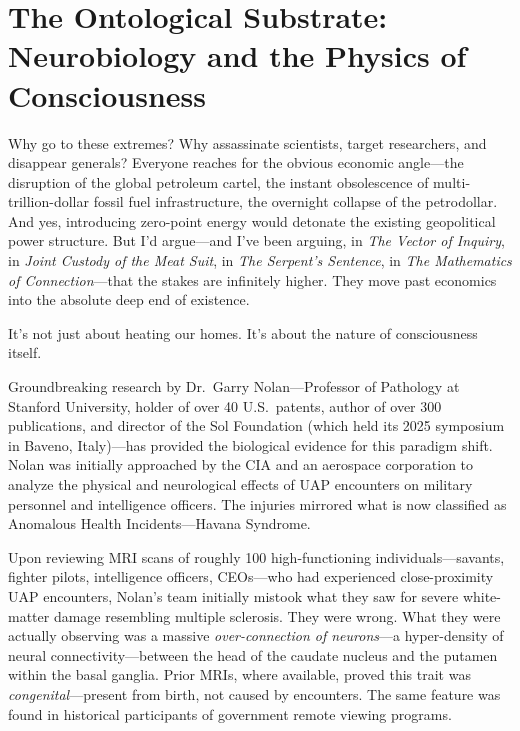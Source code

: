 \documentclass[11pt,a4paper]{article}
\begin{document}
\section{The Ontological Substrate: Neurobiology and the Physics of Consciousness}

Why go to these extremes? Why assassinate scientists, target researchers, and disappear generals? Everyone reaches for the obvious economic angle---the disruption of the global petroleum cartel, the instant obsolescence of multi-trillion-dollar fossil fuel infrastructure, the overnight collapse of the petrodollar. And yes, introducing zero-point energy would detonate the existing geopolitical power structure. But I'd argue---and I've been arguing, in \textit{The Vector of Inquiry}, in \textit{Joint Custody of the Meat Suit}, in \textit{The Serpent's Sentence}, in \textit{The Mathematics of Connection}---that the stakes are infinitely higher. They move past economics into the absolute deep end of existence.

It's not just about heating our homes. It's about the nature of consciousness itself.

Groundbreaking research by Dr.\ Garry Nolan---Professor of Pathology at Stanford University, holder of over 40 U.S.\ patents, author of over 300 publications, and director of the Sol Foundation (which held its 2025 symposium in Baveno, Italy)---has provided the biological evidence for this paradigm shift. Nolan was initially approached by the CIA and an aerospace corporation to analyze the physical and neurological effects of UAP encounters on military personnel and intelligence officers. The injuries mirrored what is now classified as Anomalous Health Incidents---Havana Syndrome.

Upon reviewing MRI scans of roughly 100 high-functioning individuals---savants, fighter pilots, intelligence officers, CEOs---who had experienced close-proximity UAP encounters, Nolan's team initially mistook what they saw for severe white-matter damage resembling multiple sclerosis. They were wrong. What they were actually observing was a massive \textit{over-connection of neurons}---a hyper-density of neural connectivity---between the head of the caudate nucleus and the putamen within the basal ganglia. Prior MRIs, where available, proved this trait was \textit{congenital}---present from birth, not caused by encounters. The same feature was found in historical participants of government remote viewing programs.
\end{document}

